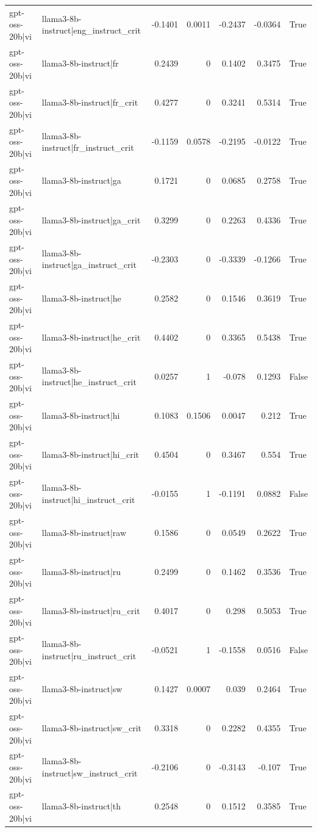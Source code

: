 \begin{table}
\begin{tabular}{l l r r r r l}
gpt-oss-20b|vi & llama3-8b-instruct|eng_instruct_crit & -0.1401 & 0.0011 & -0.2437 & -0.0364 & True \\
gpt-oss-20b|vi & llama3-8b-instruct|fr & 0.2439 & 0 & 0.1402 & 0.3475 & True \\
gpt-oss-20b|vi & llama3-8b-instruct|fr_crit & 0.4277 & 0 & 0.3241 & 0.5314 & True \\
gpt-oss-20b|vi & llama3-8b-instruct|fr_instruct_crit & -0.1159 & 0.0578 & -0.2195 & -0.0122 & True \\
gpt-oss-20b|vi & llama3-8b-instruct|ga & 0.1721 & 0 & 0.0685 & 0.2758 & True \\
gpt-oss-20b|vi & llama3-8b-instruct|ga_crit & 0.3299 & 0 & 0.2263 & 0.4336 & True \\
gpt-oss-20b|vi & llama3-8b-instruct|ga_instruct_crit & -0.2303 & 0 & -0.3339 & -0.1266 & True \\
gpt-oss-20b|vi & llama3-8b-instruct|he & 0.2582 & 0 & 0.1546 & 0.3619 & True \\
gpt-oss-20b|vi & llama3-8b-instruct|he_crit & 0.4402 & 0 & 0.3365 & 0.5438 & True \\
gpt-oss-20b|vi & llama3-8b-instruct|he_instruct_crit & 0.0257 & 1 & -0.078 & 0.1293 & False \\
gpt-oss-20b|vi & llama3-8b-instruct|hi & 0.1083 & 0.1506 & 0.0047 & 0.212 & True \\
gpt-oss-20b|vi & llama3-8b-instruct|hi_crit & 0.4504 & 0 & 0.3467 & 0.554 & True \\
gpt-oss-20b|vi & llama3-8b-instruct|hi_instruct_crit & -0.0155 & 1 & -0.1191 & 0.0882 & False \\
gpt-oss-20b|vi & llama3-8b-instruct|raw & 0.1586 & 0 & 0.0549 & 0.2622 & True \\
gpt-oss-20b|vi & llama3-8b-instruct|ru & 0.2499 & 0 & 0.1462 & 0.3536 & True \\
gpt-oss-20b|vi & llama3-8b-instruct|ru_crit & 0.4017 & 0 & 0.298 & 0.5053 & True \\
gpt-oss-20b|vi & llama3-8b-instruct|ru_instruct_crit & -0.0521 & 1 & -0.1558 & 0.0516 & False \\
gpt-oss-20b|vi & llama3-8b-instruct|sw & 0.1427 & 0.0007 & 0.039 & 0.2464 & True \\
gpt-oss-20b|vi & llama3-8b-instruct|sw_crit & 0.3318 & 0 & 0.2282 & 0.4355 & True \\
gpt-oss-20b|vi & llama3-8b-instruct|sw_instruct_crit & -0.2106 & 0 & -0.3143 & -0.107 & True \\
gpt-oss-20b|vi & llama3-8b-instruct|th & 0.2548 & 0 & 0.1512 & 0.3585 & True \\

\end{tabular}
\end{table}
